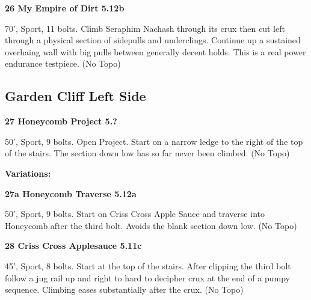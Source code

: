 \begin{multicols}{2}
\needspace{1.5cm}
\label{rt:My Empire of Dirt}
\colorbox{Goldenrod!50}{
\parbox{0.95\linewidth}{
\textbf{
26 My Empire of Dirt 5.12b  
}}}
\begin{adjustwidth}{0.5cm}{}			
70', Sport, 11 bolts. Climb Seraphim Nachash through its crux then cut left through a physical section of sidepulls and underclings. Continue up a sustained overhaing wall with big pulls between generally decent holds. This is a real power endurance testpiece.
  (No Topo)
\end{adjustwidth}





\needspace{1.5cm}
\subsection*{Garden Cliff Left Side}\label{bf:Garden Cliff Left Side}
	


\needspace{1.5cm}
\label{rt:Honeycomb Project}
\colorbox{black!20}{
\parbox{0.95\linewidth}{
\textbf{
27 Honeycomb Project 5.?  
}}}
\begin{adjustwidth}{0.5cm}{}			
50', Sport, 9 bolts. Open Project. Start on a narrow ledge to the right of the top of the stairs. The section down low has so far never been climbed.
  (No Topo)
\end{adjustwidth}


\begin{adjustwidth}{0.5cm}{}				
\needspace{3cm}
\textbf{Variations:} \newline

\needspace{1.5cm}
\label{vr:Honeycomb Traverse}
\colorbox{Goldenrod!50}{
\parbox{0.95\linewidth}{
\textbf{
27a Honeycomb Traverse 5.12a  
}}}
\begin{adjustwidth}{0.5cm}{}			
50', Sport, 9 bolts. Start on Criss Cross Apple Sauce and traverse into Honeycomb after the third bolt. Avoids the blank section down low.
  (No Topo)
\end{adjustwidth}



\end{adjustwidth}


\needspace{1.5cm}
\label{rt:Criss Cross Applesauce}
\colorbox{RoyalBlue!20}{
\parbox{0.95\linewidth}{
\textbf{
28 Criss Cross Applesauce 5.11c  
}}}
\begin{adjustwidth}{0.5cm}{}			
45', Sport, 8 bolts. Start at the top of the stairs. After clipping the third bolt follow a jug rail up and right to hard to decipher crux at the end of a pumpy sequence. Climbing eases substantially after the crux.
  (No Topo)
\end{adjustwidth}





\end{multicols}
